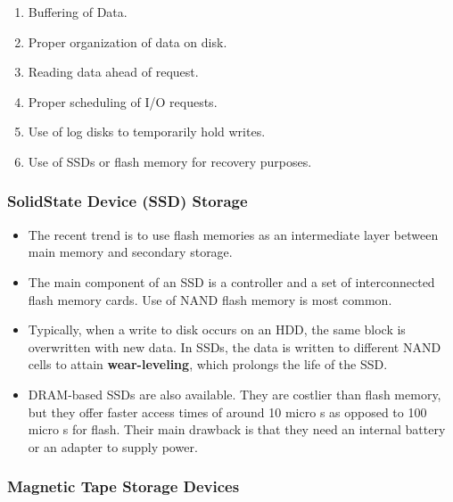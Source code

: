 \documentclass[10pt]{article}
\newcommand{\tf}{\textbf}
\begin{document}
\begin{enumerate}
	\item Buffering of Data.
	\item Proper organization of data on disk.
	\item Reading data ahead of request.
	\item Proper scheduling of I/O requests.
	\item Use of log disks to temporarily hold writes.
	\item Use of SSDs or flash memory for recovery purposes.
\end{enumerate}

\subsubsection{SolidState Device (SSD) Storage}

\begin{itemize}
	\item The recent trend is to use flash memories as an intermediate layer between main memory and secondary storage.
	\item The main component of an SSD is a controller and a set of interconnected flash memory cards. Use of NAND flash memory is most common. 
	\item Typically, when a write to disk occurs on an HDD, the same block is overwritten with new data. In SSDs, the data is written to different NAND cells to attain \tf{wear-leveling}, which prolongs the life of the SSD.
	\item DRAM-based SSDs are also available. They are costlier than flash memory, but they offer faster access times of around 10 micro s as opposed to 100 micro s for flash. Their main drawback is that they need an internal battery or an adapter to supply power. 
\end{itemize}

\subsubsection{Magnetic Tape Storage Devices}
\end{document}
